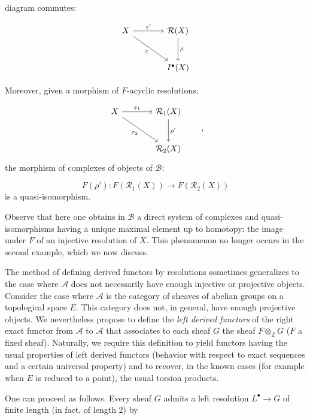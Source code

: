 %
diagram commutes:

\[
\begin{tikzcd}[column sep=large,row sep=large]
X \arrow[r,"\varepsilon'"] \arrow[dr,"\varepsilon"']
  & \mathcal R(X) \arrow[d,"\rho"] \\
  & I^{\bullet}(X)
\end{tikzcd}
\]

Moreover, given a morphism of $F$-acyclic resolutions:

\[
\begin{tikzcd}[column sep=large,row sep=large]
X \arrow[r,"\varepsilon_1"] \arrow[dr,"\varepsilon_2"']
  & \mathcal R_1(X) \arrow[d,"\rho'"] \\
  & \mathcal R_2(X)
\end{tikzcd}
\qquad\text{,}
\]
the morphism of complexes of objects of $\mathcal B$:

\[
F(\rho') : F(\mathcal R_1(X)) \longrightarrow F(\mathcal R_2(X))
\]
is a quasi-isomorphism.

Observe that here one obtains in $\mathcal B$ a direct system of complexes and
quasi-isomorphisms having a unique maximal element up to homotopy: the image
under $F$ of an injective resolution of $X$. This phenomenon no longer occurs
in the second example, which we now discuss.

The method of defining derived functors by resolutions sometimes generalizes
to the case where $\mathcal A$ does not necessarily have enough injective or
projective objects. Consider the case where $\mathcal A$ is the category of
sheaves of abelian groups on a topological space $E$. This category does not,
in general, have enough projective objects. We nevertheless propose to define
the \emph{left derived functors} of the right exact functor from $\mathcal A$
to $\mathcal A$ that associates to each sheaf $G$ the sheaf
$F\otimes_{\mathbb Z}G$ ($F$ a fixed sheaf). Naturally, we require this
definition to yield functors having the usual properties of left derived
functors (behavior with respect to exact sequences and a certain universal
property) and to recover, in the known cases (for example when $E$ is reduced
to a point), the usual torsion products.

One can proceed as follows. Every sheaf $G$ admits a left resolution
$L^{\bullet}\to G$ of finite length (in fact, of length 2) by
